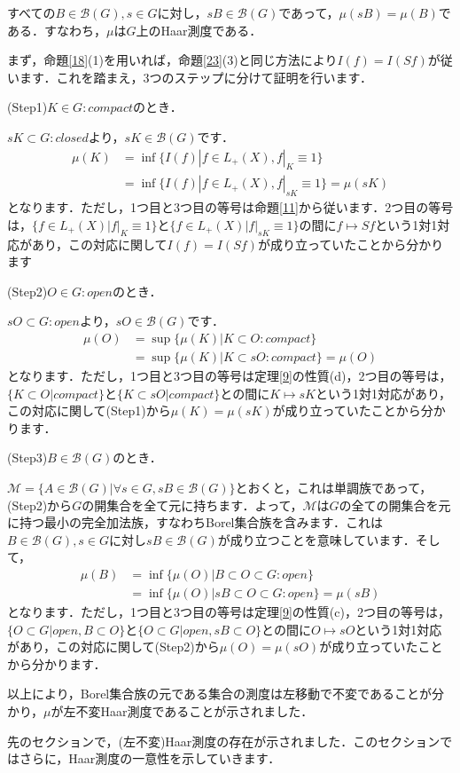 \begin{yprop}\label{25}
すべての$B \in \mathscr{B}(G), s \in G$に対し，$sB \in \mathscr{B}(G)$であって，$\mu(sB)=\mu(B)$である．すなわち，$\mu$は$G$上のHaar測度である．
\end{yprop}
\begin{Proof}
まず，命題\ref{18}(1)を用いれば，命題\ref{23}(3)と同じ方法により$I(f)=I(Sf)$が従います．これを踏まえ，3つのステップに分けて証明を行います．

(Step1)$K \in G \colon compact$のとき．

$sK \subset G \colon closed$より，$sK \in  \mathscr{B}(G)$です．
\begin{align*}
\mu(K) & = \inf \{ I(f) | f \in L_{+}(X), f|_{K} \equiv 1 \} \\
 & =\inf \{ I(f) | f \in L_{+}(X), f|_{sK} \equiv 1 \}=\mu(sK)
\end{align*}
となります．ただし，1つ目と3つ目の等号は命題\ref{11}から従います．2つ目の等号は，$\{ f \in L_{+}(X) | f|_{K} \equiv 1 \}$と$\{ f \in L_{+}(X) | f|_{sK} \equiv 1 \}$の間に$f \mapsto Sf$という1対1対応があり，この対応に関して$I(f)=I(Sf)$が成り立っていたことから分かります

(Step2)$O \in G \colon open$のとき．

$sO \subset G \colon open$より，$sO \in \mathscr{B}(G)$です．
\begin{align*}
\mu(O) & = \sup \{ \mu(K) | K \subset O \colon compact \} \\
 & =\sup \{ \mu(K) | K \subset sO \colon compact \} = \mu (O)
\end{align*}
となります．ただし，1つ目と3つ目の等号は定理\ref{9}の性質(d)，2つ目の等号は，$\{ K \subset O | compact \}$と$\{ K \subset sO | compact \}$との間に$K \mapsto sK$という1対1対応があり，この対応に関して(Step1)から$\mu(K)=\mu(sK)$が成り立っていたことから分かります．

(Step3)$B \in \mathscr{B}(G)$のとき．

$\mathscr{M}=\{A \in \mathscr{B}(G) | \forall s \in G , sB \in \mathscr{B}(G) \}$とおくと，これは単調族であって，(Step2)から$G$の開集合を全て元に持ちます．よって，$\mathscr{M}$は$G$の全ての開集合を元に持つ最小の完全加法族，すなわちBorel集合族を含みます．これは$B \in \mathscr{B}(G), s \in G$に対し$ sB \in \mathscr{B}(G)$が成り立つことを意味しています．そして，
\begin{align*}
\mu(B) & = \inf \{ \mu(O) | B \subset O \subset G \colon open\} \\
 & = \inf \{ \mu(O) | sB \subset O \subset G \colon open\} = \mu(sB)
\end{align*}
となります．ただし，1つ目と3つ目の等号は定理\ref{9}の性質(c)，2つ目の等号は，$\{ O \subset G | open, B \subset O \}$と$\{ O \subset G | open, sB \subset O \}$との間に$O \mapsto sO$という1対1対応があり，この対応に関して(Step2)から$\mu(O)=\mu(sO)$が成り立っていたことから分かります．

以上により，Borel集合族の元である集合の測度は左移動で不変であることが分かり，$\mu$が左不変Haar測度であることが示されました．　
\end{Proof}
先のセクションで，(左不変)Haar測度の存在が示されました．このセクションではさらに，Haar測度の一意性を示していきます．

